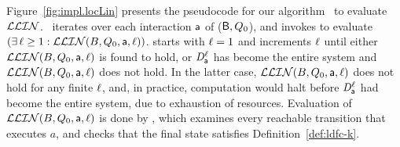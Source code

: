 

Figure~\ref{fig:impl.locLin} presents the pseudocode for our algorithm
\ to evaluate $\mathcal{LLIN}$.
%
\ iterates over each interaction $\mathsf{a}$ of ($\mathsf{B},Q_0$), and 
invokes  to evaluate $(\exists\, \ell \ge 1: \mathcal{LLIN}(B, Q_0, \mathsf{a}, \ell))$.
starts with $\ell=1$ and increments $\ell$ until either $\mathcal{LLIN}(B, Q_0, \mathsf{a}, \ell)$ is found to hold, or
$\mathit{D}_{\mathsf{a}}^{\ell}$ has become the entire system and $\mathcal{LLIN}(B, Q_0, \mathsf{a}, \ell)$ does not hold. In the
latter case, $\mathcal{LLIN}(B, Q_0, \mathsf{a}, \ell)$ does not hold for any finite $\ell$, and, in practice,
computation would halt before $\mathit{D}_{\mathsf{a}}^{\ell}$ had become the entire system, due to exhaustion of
resources. Evaluation of $\mathcal{LLIN}(B, Q_0, \mathsf{a}, \ell)$ is done by 
, which examines every reachable transition
that executes $a$, and checks that the final state satisfies
Definition~\ref{def:ldfc-k}. 

